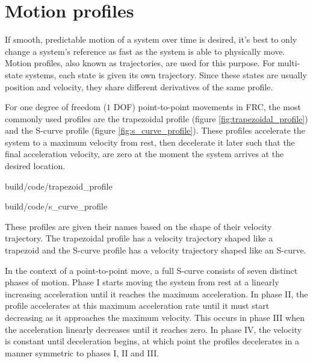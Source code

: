 
\chapter{Motion profiles}

If smooth, predictable motion of a \gls{system} over time is desired, it's best
to only change a \gls{system}'s \gls{reference} as fast as the \gls{system} is
able to physically move. Motion profiles, also known as trajectories, are used
for this purpose. For multi-state \glspl{system}, each \gls{state} is given its
own trajectory. Since these \glspl{state} are usually position and velocity,
they share different derivatives of the same profile.

For one degree of freedom ($1$ DOF) point-to-point movements in FRC, the most
commonly used profiles are the trapezoidal profile (figure
\ref{fig:trapezoidal_profile}) and the S-curve profile (figure
\ref{fig:s_curve_profile}). These profiles accelerate the \gls{system} to a
maximum velocity from rest, then decelerate it later such that the final
acceleration velocity, are zero at the moment the \gls{system} arrives at the
desired location.

\begin{bookfigure}
  \begin{minisvg}{build/code/trapezoid_profile}
    \caption{Trapezoidal profile}
    \label{fig:trapezoidal_profile}
  \end{minisvg}
  \hfill
  \begin{minisvg}{build/code/s_curve_profile}
    \caption{S-curve profile}
    \label{fig:s_curve_profile}
  \end{minisvg}
\end{bookfigure}

These profiles are given their names based on the shape of their velocity
trajectory. The trapezoidal profile has a velocity trajectory shaped like a
trapezoid and the S-curve profile has a velocity trajectory shaped like an
S-curve.

In the context of a point-to-point move, a full S-curve consists of seven
distinct phases of motion. Phase I starts moving the \gls{system} from rest at a
linearly increasing acceleration until it reaches the maximum acceleration. In
phase II, the profile accelerates at this maximum acceleration rate until it
must start decreasing as it approaches the maximum velocity. This occurs in
phase III when the acceleration linearly decreases until it reaches zero. In
phase IV, the velocity is constant until deceleration begins, at which point the
profiles decelerates in a manner symmetric to phases I, II and III.

